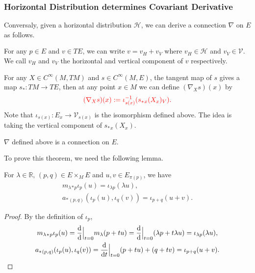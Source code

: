 \subsubsection{Horizontal Distribution determines Covariant Derivative}
Conversaly, given a horizontal distribution $\mathcal{H}$, we can derive a connection $\nabla$ on $E$ as follows. 
\begin{definition}
    For any $p\in E$ and $v\in TE$, we can write $v = v_H + v_V$ where 
    $v_H\in \mathcal{H}$ and $v_V\in \mathcal{V}$. We call $v_H$ and $v_V$ 
    the horizontal and vertical component of $v$ respectively.
\end{definition}
For any $X\in C^\infty(M,TM)$ and $s\in C^\infty(M,E)$, the tangent map of $s$ gives a map $s_*: TM \to TE$, 
then at any point $x\in M$ we can define $(\nabla_X s)(x)$ by
\begin{equation*}
    \textcolor{red}{(\nabla_X s)(x) := \iota_{s(x)}^{-1}(s_*{}_x(X_x)_V).}
\end{equation*}
Note that $\iota_{s(x)}: E_x \to \mathcal{V}_{s(x)}$ is the isomorphism defined above. 
The idea is taking the vertical component of $s_*{}_x(X_x)$.
\begin{theorem}\label{thm:connection-from-horizontal-distribution}
    $\nabla$ defined above is a connection on $E$.
\end{theorem}
To prove this theorem, we need the following lemma.
\begin{lemma}\label{lem:tangent-map-of-linear-ops-acts-on-vertical-bundle}
    For $\lambda\in\mathbb{R},\,(p,q)\in E\times_M E$ and $u,v\in E_{\pi(p)}$, we have  
    \begin{gather*}
        m_{\lambda}{}_*{}_p \iota_p(u) = \iota_{\lambda p}(\lambda u), \\
        a_*{}_{(p,q)}(\iota_p(u),\iota_q(v)) = \iota_{p+q}(u+v).
    \end{gather*}
\end{lemma}
\begin{proof}
    By the definition of $\iota_p$, 
    \begin{gather*}
        m_{\lambda}{}_*{}_p \iota_p(u) = \frac{{\rm d} }{{\rm d}}\Big|_{t=0} m_{\lambda}(p + t u) 
        = \frac{{\rm d} }{{\rm d}}\Big|_{t=0} (\lambda p + t \lambda u) = \iota_{\lambda p}(\lambda u), \\
        a_*{}_{(p,q)}(\iota_p(u),\iota_q(v)) = \frac{{\rm d} }{{\rm d} t}\Big|_{t=0} (p + t u) + (q + t v) 
        = \iota_{p+q}(u+v).
    \end{gather*}
\end{proof}

